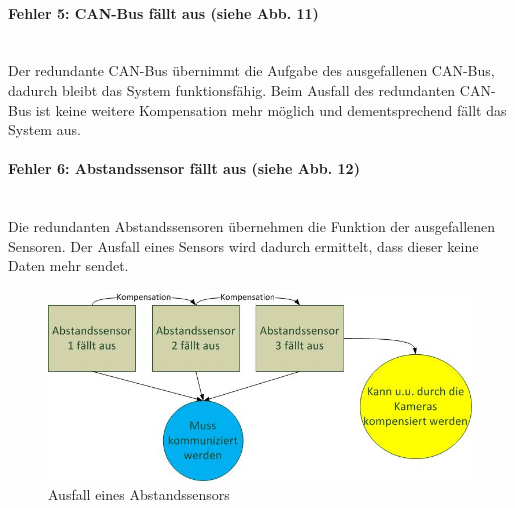 \paragraph{\textbf{Fehler 5: CAN-Bus fällt aus (siehe Abb. 11)}}$\;$\\
Der redundante CAN-Bus übernimmt die Aufgabe des ausgefallenen CAN-Bus, dadurch bleibt das System funktionsfähig.
Beim Ausfall des redundanten CAN-Bus ist keine weitere Kompensation mehr möglich und dementsprechend fällt das System aus.

\paragraph{\textbf{Fehler 6: Abstandssensor fällt aus (siehe Abb. 12)}}$\;$\\
Die redundanten Abstandssensoren übernehmen die Funktion der ausgefallenen Sensoren.
Der Ausfall eines Sensors wird dadurch ermittelt, dass dieser keine Daten mehr sendet. %
\begin{figure}[H]
\centering
\includegraphics[width=0.7\linewidth]{Bilder/FaTNet_abstandssensoredundanz}
\caption{Ausfall eines Abstandssensors}
\label{fig:abstandssensorredundanz}
\end{figure}
